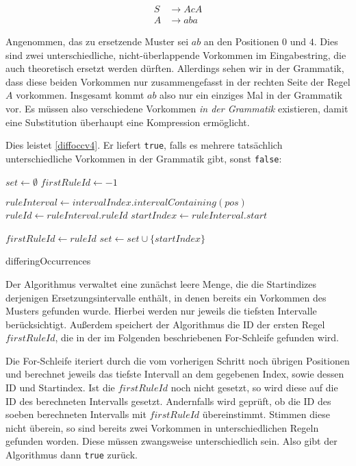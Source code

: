 \begin{align*}
    S &\rightarrow AcA\\
    A &\rightarrow aba
\end{align*}

Angenommen, das zu ersetzende Muster sei $ab$ an den Positionen $0$ und $4$. Dies sind zwei unterschiedliche, nicht-überlappende Vorkommen im Eingabestring, die auch theoretisch ersetzt werden dürften. Allerdings sehen wir in der Grammatik, dass diese beiden Vorkommen nur zusammengefasst in der rechten Seite der Regel $A$ vorkommen. Insgesamt kommt $ab$ also nur ein einziges Mal in der Grammatik vor. Es müssen also verschiedene Vorkommen \emph{in der Grammatik} existieren, damit eine Substitution überhaupt eine Kompression ermöglicht.

Dies leistet \autoref{diffoccv4}. Er liefert \texttt{true}, falls es mehrere tatsächlich unterschiedliche Vorkommen in der Grammatik gibt, sonst \texttt{false}:

\begin{algorithm}[t]
    $set \leftarrow \emptyset$\;
    $firstRuleId \leftarrow -1$\;
     {
         { 
            \KwContinue\;
        }
        $ruleInterval \leftarrow intervalIndex.intervalContaining(pos)$\;
        $ruleId \leftarrow ruleInterval.ruleId$\;
        $startIndex \leftarrow ruleInterval.start$\;

         {
            $firstRuleId \leftarrow ruleId$\;
        }
         {
        }
        $set \leftarrow set \cup \{startIndex\}$\;
    }
    
    \caption{differingOccurrences}
    \label{diffoccv4}
\end{algorithm}

Der Algorithmus verwaltet eine zunächst leere Menge, die die Startindizes derjenigen Ersetzungsintervalle enthält, in denen bereits ein Vorkommen des Musters gefunden wurde. Hierbei werden nur jeweils die tiefsten Intervalle berücksichtigt. Außerdem speichert der Algorithmus die ID der ersten Regel $firstRuleId$, die in der im Folgenden beschriebenen For-Schleife gefunden wird.

Die For-Schleife iteriert durch die vom vorherigen Schritt noch übrigen Positionen und berechnet jeweils das tiefste Intervall an dem gegebenen Index, sowie dessen ID und Startindex. Ist die $firstRuleId$ noch nicht gesetzt, so wird diese auf die ID des berechneten Intervalls gesetzt. Andernfalls wird geprüft, ob die ID des soeben berechneten Intervalls mit $firstRuleId$ übereinstimmt. Stimmen diese nicht überein, so sind bereits zwei Vorkommen in unterschiedlichen Regeln gefunden worden. Diese müssen zwangsweise unterschiedlich sein. Also gibt der Algorithmus dann \texttt{true} zurück.


